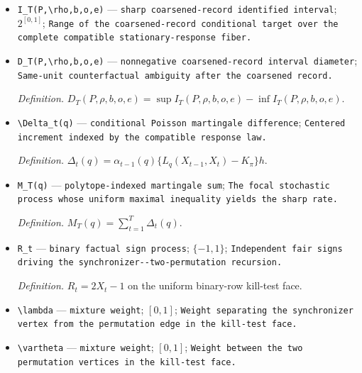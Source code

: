 \documentclass{article}
\begin{document}
\begin{itemize}
  \par\smallskip\noindent\emph{Definition.} \(D^{\mathrm{full}}_T(P,\rho,b,x_{0:T})=\sup I^{\mathrm{full}}_T(P,\rho,b,x_{0:T})-\inf I^{\mathrm{full}}_T(P,\rho,b,x_{0:T})\).
  \item \texttt{I\_\allowbreak{}T(P,\allowbreak{}\textbackslash{}\allowbreak{}rho,\allowbreak{}b,\allowbreak{}o,\allowbreak{}e)} --- \texttt{sharp coarsened-\allowbreak{}record identified interval}; \(2^{[0,1]}\); \texttt{Range of the coarsened-\allowbreak{}record conditional target over the complete compatible stationary-\allowbreak{}response fiber.}
  \item \texttt{D\_\allowbreak{}T(P,\allowbreak{}\textbackslash{}\allowbreak{}rho,\allowbreak{}b,\allowbreak{}o,\allowbreak{}e)} --- \texttt{nonnegative coarsened-\allowbreak{}record interval diameter}; \texttt{Same-\allowbreak{}unit counterfactual ambiguity after the coarsened record.}
  \par\smallskip\noindent\emph{Definition.} \(D_T(P,\rho,b,o,e)=\sup I_T(P,\rho,b,o,e)-\inf I_T(P,\rho,b,o,e)\).
  \item \texttt{\textbackslash{}\allowbreak{}Delta\_\allowbreak{}t(q)} --- \texttt{conditional Poisson martingale difference}; \texttt{Centered increment indexed by the compatible response law.}
  \par\smallskip\noindent\emph{Definition.} \(\Delta_t(q)=\alpha_{t-1}(q)\{L_q(X_{t-1},X_t)-K_{\pi}\}h\).
  \item \texttt{M\_\allowbreak{}T(q)} --- \texttt{polytope-\allowbreak{}indexed martingale sum}; \texttt{The focal stochastic process whose uniform maximal inequality yields the sharp rate.}
  \par\smallskip\noindent\emph{Definition.} \(M_T(q)=\sum_{t=1}^T\Delta_t(q)\).
  \item \texttt{R\_\allowbreak{}t} --- \texttt{binary factual sign process}; \(\{-1,1\}\); \texttt{Independent fair signs driving the synchronizer-\allowbreak{}-\allowbreak{}two-\allowbreak{}permutation recursion.}
  \par\smallskip\noindent\emph{Definition.} \(R_t=2X_t-1\) on the uniform binary-row kill-test face.
  \item \texttt{\textbackslash{}\allowbreak{}lambda} --- \texttt{mixture weight}; \([0,1]\); \texttt{Weight separating the synchronizer vertex from the permutation edge in the kill-\allowbreak{}test face.}
  \item \texttt{\textbackslash{}\allowbreak{}vartheta} --- \texttt{mixture weight}; \([0,1]\); \texttt{Weight between the two permutation vertices in the kill-\allowbreak{}test face.}

\end{itemize}
\end{document}
